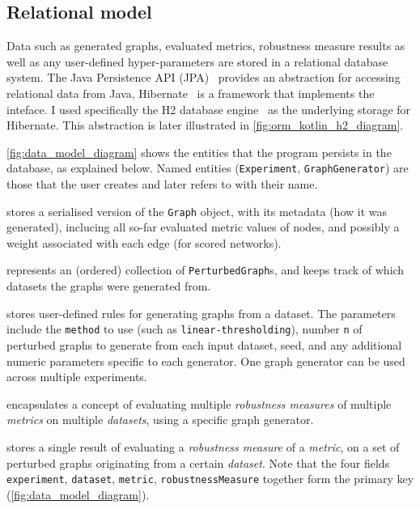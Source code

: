 \subsection{Relational model}

Data such as generated graphs, evaluated metrics, robustness measure results as well as any user-defined hyper-parameters are stored in a relational database system.
The Java Persistence API (JPA)~\cite{BiswasJavaPersistenceAPI2016} provides an abstraction for accessing relational data from Java, Hibernate~\cite{ElliottHibernateDeveloperNotebook2004,BauerJavaPersistenceHibernate2015} is a framework that implements the inteface.
I used specifically the H2 database engine~\cite{MuellerH2DatabaseEngine2006} as the underlying storage for Hibernate.
This abstraction is later illustrated in \autoref{fig:orm_kotlin_h2_diagram}.



\autoref{fig:data_model_diagram} shows the entities that the program persists in the database, as explained below.
Named entities (\texttt{Experiment}, \texttt{GraphGenerator}) are those that the user creates and later refers to with their name.
\begin{description}[itemsep=\zerospace]
    \item[\texttt{PerturbedGraph}]
    stores a serialised version of the \texttt{Graph} object, with its metadata (how it was generated), inclucing all so-far evaluated metric values of nodes, and possibly a weight associated with each edge (for scored networks).

    \item[\texttt{GraphCollection}]
    represents an (ordered) collection of \texttt{PerturbedGraph}s, and keeps track of which datasets the graphs were generated from.

    \item[\texttt{GraphGenerator}]
    stores user-defined rules for generating graphs from a dataset.
    The parameters include the \texttt{method} to use (such as \texttt{linear-thresholding}), number \texttt{n} of perturbed graphs to generate from each input dataset, seed, and any additional numeric parameters specific to each generator.
    One graph generator can be used across multiple experiments.

    \item[\texttt{Experiment}]
    encapsulates a concept of evaluating multiple \textsl{robustness measures} of multiple \textsl{metrics} on multiple \textsl{datasets}, using a specific graph generator.

    \item[\texttt{Robustness}]
    stores a single result of evaluating a \textsl{robustness measure} of a \textsl{metric}, on a set of perturbed graphs originating from a certain \textsl{dataset}.
    Note that the four fields \texttt{experiment}, \texttt{dataset}, \texttt{metric}, \texttt{robustnessMeasure} together form the primary key (\autoref{fig:data_model_diagram}).
\end{description}

